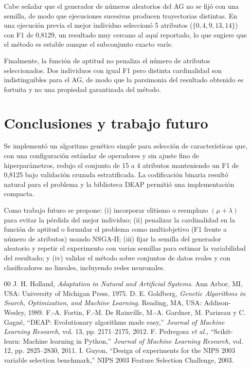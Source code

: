 \documentclass[conference]{IEEEtran}
\begin{document}
Cabe señalar que el generador de números aleatorios del AG no se fijó con una semilla, de modo que ejecuciones sucesivas producen trayectorias distintas. En una ejecución previa el mejor individuo seleccionó 5 atributos ($\{0, 4, 9, 13, 14\}$) con F1 de 0,8129, un resultado muy cercano al aquí reportado, lo que sugiere que el método es estable aunque el subconjunto exacto varíe.

Finalmente, la función de aptitud no penaliza el número de atributos seleccionados. Dos individuos con igual F1 pero distinta cardinalidad son indistinguibles para el AG, de modo que la parsimonia del resultado obtenido es fortuita y no una propiedad garantizada del método.

\section{Conclusiones y trabajo futuro}\label{sec:conclusiones}
Se implementó un algoritmo genético simple para selección de características que, con una configuración estándar de operadores y sin ajuste fino de hiperparámetros, redujo el conjunto de 15 a 4 atributos manteniendo un F1 de 0,8125 bajo validación cruzada estratificada. La codificación binaria resultó natural para el problema y la biblioteca DEAP permitió una implementación compacta.

Como trabajo futuro se propone: (i) incorporar elitismo o reemplazo $(\mu+\lambda)$ para evitar la pérdida del mejor individuo; (ii) penalizar la cardinalidad en la función de aptitud o formular el problema como multiobjetivo (F1 frente a número de atributos) usando NSGA-II; (iii) fijar la semilla del generador aleatorio y repetir el experimento con varias semillas para estimar la variabilidad del resultado; y (iv) validar el método sobre conjuntos de datos reales y con clasificadores no lineales, incluyendo redes neuronales.

\begin{thebibliography}{00}
 J. H. Holland, \emph{Adaptation in Natural and Artificial Systems}. Ann Arbor, MI, USA: University of Michigan Press, 1975.
 D. E. Goldberg, \emph{Genetic Algorithms in Search, Optimization, and Machine Learning}. Reading, MA, USA: Addison-Wesley, 1989.
 F.-A. Fortin, F.-M. De Rainville, M.-A. Gardner, M. Parizeau y C. Gagné, ``DEAP: Evolutionary algorithms made easy,'' \emph{Journal of Machine Learning Research}, vol. 13, pp. 2171--2175, 2012.
 F. Pedregosa \emph{et al.}, ``Scikit-learn: Machine learning in Python,'' \emph{Journal of Machine Learning Research}, vol. 12, pp. 2825--2830, 2011.
 I. Guyon, ``Design of experiments for the NIPS 2003 variable selection benchmark,'' NIPS 2003 Feature Selection Challenge, 2003.
\end{thebibliography}
\end{document}
